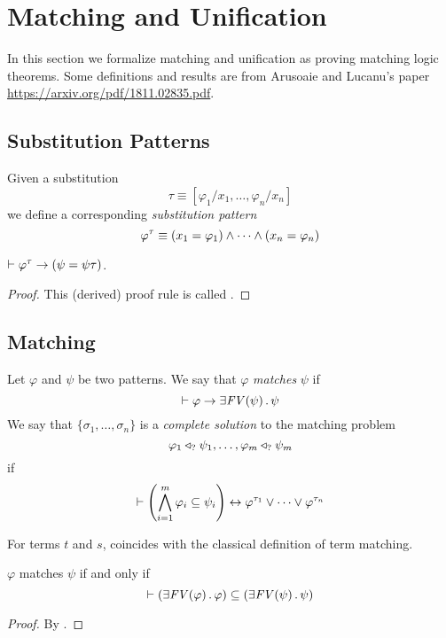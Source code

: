 \documentclass{article}
\begin{document}
\section{Matching and Unification}

In this section we formalize matching and unification as proving matching logic theorems.
Some definitions and results are from Arusoaie and Lucanu's paper \url{https://arxiv.org/pdf/1811.02835.pdf}. 

\subsection{Substitution Patterns}

\begin{definition}
Given a substitution
\[\tau \equiv [\varphi_1 / x_1 , \dots , \varphi_n / x_n] \]
we define a corresponding \emph{substitution pattern}
\[\varphi^\tau \equiv (x_1 = \varphi_1) \land \dots \land (x_n = \varphi_n) \]
\end{definition}

\begin{proposition}
$\vdash \varphi^\tau \rightarrow (\psi = \psi\tau)$.
\end{proposition}
\begin{proof}
This (derived) proof rule is called . 
\end{proof}

\subsection{Matching}

\begin{definition}
\label{def:matching}
Let $\varphi$ and $\psi$ be two patterns. 
We say that $\varphi$ \emph{matches} $\psi$
if
\[\vdash \varphi \rightarrow \exists \mathit{FV(\psi)} \,.\, \psi \]
We say that $\{\sigma_1,\dots,\sigma_n\}$ is a \emph{complete solution}
to the matching problem
\[\varphi_1 \triangleleft_? \psi_1, \dots, \varphi_m \triangleleft_? \psi_m\] if
\[\vdash \left(\bigwedge_{i=1}^m \varphi_i \subseteq \psi_i \right)
  \leftrightarrow \varphi^{\tau_1} \lor \dots \lor \varphi^{\tau_n}
\]
\end{definition}

\begin{proposition}
For terms $t$ and $s$,
 coincides with the classical definition of term matching.
\end{proposition}

\begin{proposition}
$\varphi$ matches $\psi$ if and only if
\[\vdash \left(\exists \mathit{FV(\varphi)} \,.\, \varphi\right)
  \subseteq \left(\exists \mathit{FV(\psi)} \,.\, \psi\right)
\]
\end{proposition}
\begin{proof}
By .
\end{proof}
\end{document}
